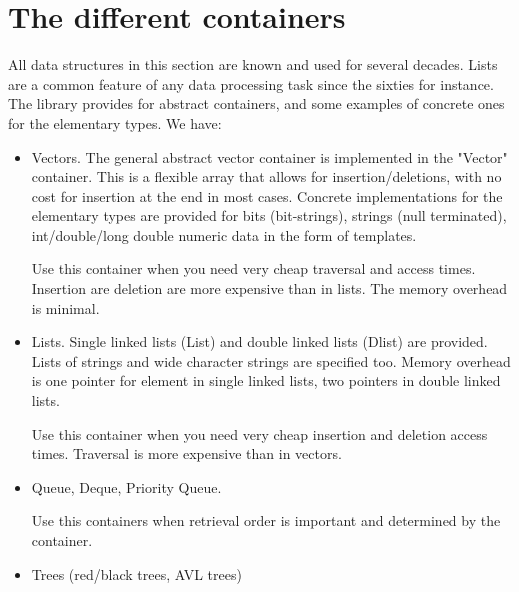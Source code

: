 \documentclass[12pt,a4paper,openany]{memoir} %
\begin{document}
\section{The different containers}
All data structures in this section are known and used for several decades. Lists are a common feature of any data processing task since the sixties for instance. 
The library provides for abstract containers, and some examples of concrete ones for the elementary types.
We have:
\begin{itemize}
\item
Vectors. The general abstract vector container is implemented in the "Vector" container. This is a flexible array that allows for insertion/deletions, 
with no cost for insertion at the end in most cases. Concrete implementations for the elementary types are provided for bits (bit-strings), strings 
(null terminated), int/double/long double numeric data in the form of templates.

Use this container when you need very cheap traversal and access times. Insertion are deletion are more expensive than in lists. The memory overhead is minimal.

\item
Lists. Single linked lists (List) and double linked lists (Dlist) are provided. Lists of strings and wide character strings are specified too. Memory overhead is one pointer for element in single linked lists, two pointers in double linked lists.

Use this container when you need very cheap insertion and deletion access times. Traversal is more expensive than in vectors.
\item
Queue, Deque, Priority Queue.

Use this containers when retrieval order is important and determined by the container.
\item
Trees (red/black trees, AVL trees)


\end{itemize}
\end{document}
